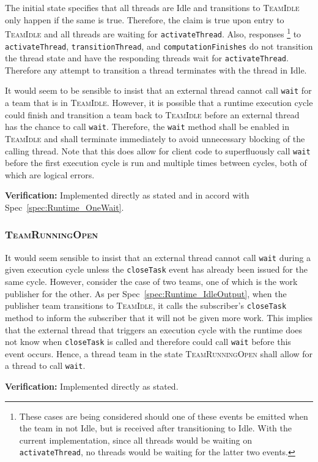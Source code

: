 \documentclass{article}
\newcommand{\TeamIdle}          {\textsc{TeamIdle}}
\newcommand{\TeamRunningOpen}   {\textsc{TeamRunningOpen}}
\begin{document}
The initial state specifies that all threads are Idle and transitions to
{\TeamIdle} only happen if the same is true.  Therefore, the claim is true upon
entry to {\TeamIdle} and all threads are waiting for \texttt{activateThread}.
Also, responses
\footnote{These cases are being considered should one of these
events be emitted when the team in not Idle, but is received after transitioning
to Idle.  With the current implementation, since all threads would be waiting on
\texttt{activateThread}, no threads would be waiting for the latter two events.}
to \texttt{activateThread}, \texttt{transitionThread}, and
\texttt{computationFinishes} do not transition the thread state and have the
responding threads wait for \texttt{activateThread}.  Therefore any attempt to
transition a thread terminates with the thread in Idle.

\begin{spec}
It would seem to be sensible to insist that an external thread cannot call
\texttt{wait} for a team that is in \TeamIdle.  However, it is possible that a
runtime execution cycle could finish and transition a team back to {\TeamIdle}
before an external thread has the chance to call \texttt{wait}.  Therefore, the
\texttt{wait} method shall be enabled in {\TeamIdle} and shall terminate immediately to avoid
unnecessary blocking of the calling thread.  Note that this does allow for
client code to superfluously call \texttt{wait} before the first execution cycle
is run and multiple times between cycles, both of which are logical errors.
\end{spec}
\textbf{Verification:}\hspace{0.125in}  Implemented directly as stated and in
accord with Spec~\ref{spec:Runtime_OneWait}.

\subsubsection{\TeamRunningOpen}
\begin{spec}
It  would seem sensible to insist that an external thread cannot call
\texttt{wait} during a given execution cycle unless the \texttt{closeTask} event
has already been issued for the same cycle.  However, consider the case of two
teams, one of which is the work publisher for the other.  As per
Spec~\ref{spec:Runtime_IdleOutput}, when the publisher team transitions to
{\TeamIdle}, it calls the subscriber's \texttt{closeTask} method to inform the
subscriber that it will not be given more work.  This implies that the external
thread that triggers an execution cycle with the runtime does not know when
\texttt{closeTask} is called and therefore could call \texttt{wait} before this
event occurs.  Hence, a thread team in the state {\TeamRunningOpen} shall allow
for a thread to call \texttt{wait}.
\end{spec}
\textbf{Verification:}\hspace{0.125in}  Implemented directly as stated.
\end{document}
